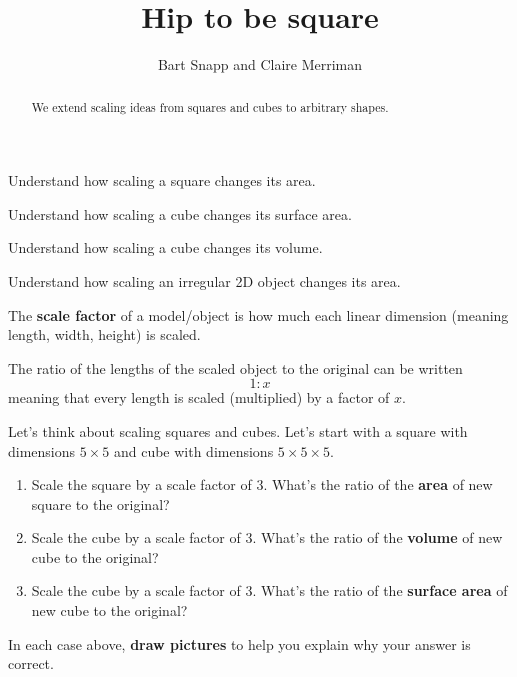 \documentclass[handout,nooutcomes,noauthor,hints,12pt]{ximera}
\title{Hip to be square}
\author{Bart Snapp and Claire Merriman}
\begin{document}
\begin{abstract}
  We extend scaling ideas from squares and cubes to arbitrary shapes.
\end{abstract}
\maketitle

\begin{listOutcomes}
\item Understand how scaling a square changes its area.
\item Understand how scaling a cube changes its surface area.
\item Understand how scaling a cube changes its volume.
\item Understand how scaling an irregular 2D object changes its area.
\end{listOutcomes}



\begin{definition}
 The \textbf{scale factor} of a model/object is how much each linear
 dimension (meaning length, width, height) is scaled.


 The ratio of the lengths of the scaled object to the original can be written
 \[
1:x
 \]
 meaning that every length is scaled (multiplied) by a factor of $x$.
\end{definition}

\mynewpage

\begin{question}
  Let's think about scaling squares and cubes. Let's start with a
  square with dimensions $5\times 5$ and cube with dimensions $5\times
  5\times 5$.
  \begin{enumerate}
  \item Scale the square by a scale factor of $3$. What's the ratio of the \textbf{area} of new square to the original?
  \item Scale the cube by a scale factor of $3$. What's the ratio of the \textbf{volume} of new cube to the original?
  \item Scale the cube by a scale factor of $3$. What's the ratio of the \textbf{surface area} of new cube to the original?
  \end{enumerate}
  In each case above, \textbf{draw pictures} to help you explain why
  your answer is correct.
\end{question}
\mynewpage
\end{document}
